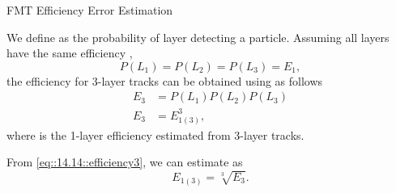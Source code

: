 \begin{frame}{FMT Efficiency Error Estimation}
    \label{20.09::fmt_efficiency_error_estimation}

    \vspace{18pt}

    We define  as the probability of layer  detecting a particle.
    Assuming all layers have the same efficiency ,
    \begin{equation*}
        P(L_1) = P(L_2) = P(L_3) = E_1,
    \end{equation*}
    the efficiency for 3-layer tracks  can be obtained using  as follows
    \begin{align}
        E_3 &= P(L_1)P(L_2)P(L_3)
        \nonumber \\
        E_3 &= E_{1(3)}^3,
        \label{eq::14.14::efficiency3}
    \end{align}
    where  is the 1-layer efficiency estimated from 3-layer tracks.

    \vspace{18pt}

    From \eqref{eq::14.14::efficiency3}, we can estimate  as
    \begin{equation}
        E_{1(3)} = \sqrt[3]{E_3}.
        \label{eq::14.14::efficiency1(3)}
    \end{equation}

\end{frame}

